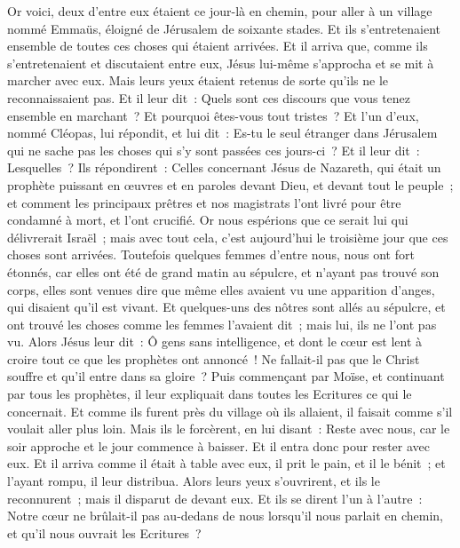 \begin{multicols}{2}
Or voici, deux d'entre eux étaient ce jour-là en chemin, pour aller à un village nommé Emmaüs, éloigné de Jérusalem de soixante stades.
Et ils s'entretenaient ensemble de toutes ces choses qui étaient arrivées.
Et il arriva que, comme ils s'entretenaient et discutaient entre eux, Jésus lui-même s'approcha et se mit à marcher avec eux.
Mais leurs yeux étaient retenus de sorte qu'ils ne le reconnaissaient pas.
Et il leur dit~: Quels sont ces discours que vous tenez ensemble en marchant~? Et pourquoi êtes-vous tout tristes~?
Et l'un d'eux, nommé Cléopas, lui répondit, et lui dit~: Es-tu le seul étranger dans Jérusalem qui ne sache pas les choses qui s'y sont passées ces jours-ci~?
Et il leur dit~: Lesquelles~? Ils répondirent~: Celles concernant Jésus de Nazareth, qui était un prophète puissant en œuvres et en paroles devant Dieu, et devant tout le peuple~;
et comment les principaux prêtres et nos magistrats l'ont livré pour être condamné à mort, et l'ont crucifié.
Or nous espérions que ce serait lui qui délivrerait Israël~; mais avec tout cela, c'est aujourd'hui le troisième jour que ces choses sont arrivées.
Toutefois quelques femmes d'entre nous, nous ont fort étonnés, car elles ont été de grand matin au sépulcre,
et n'ayant pas trouvé son corps, elles sont venues dire que même elles avaient vu une apparition d'anges, qui disaient qu'il est vivant.
Et quelques-uns des nôtres sont allés au sépulcre, et ont trouvé les choses comme les femmes l'avaient dit~; mais lui, ils ne l'ont pas vu.
Alors Jésus leur dit~: Ô gens sans intelligence, et dont le cœur est lent à croire tout ce que les prophètes ont annoncé~!
Ne fallait-il pas que le Christ souffre et qu'il entre dans sa gloire~?
Puis commençant par Moïse, et continuant par tous les prophètes, il leur expliquait dans toutes les Ecritures ce qui le concernait.
Et comme ils furent près du village où ils allaient, il faisait comme s'il voulait aller plus loin.
Mais ils le forcèrent, en lui disant~: Reste avec nous, car le soir approche et le jour commence à baisser. Et il entra donc pour rester avec eux.
Et il arriva comme il était à table avec eux, il prit le pain, et il le bénit~; et l'ayant rompu, il leur distribua.
Alors leurs yeux s'ouvrirent, et ils le reconnurent~; mais il disparut de devant eux.
Et ils se dirent l'un à l'autre~: Notre cœur ne brûlait-il pas au-dedans de nous lorsqu'il nous parlait en chemin, et qu'il nous ouvrait les Ecritures~?

\end{multicols}

